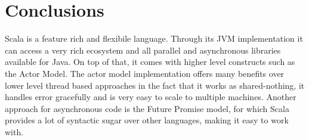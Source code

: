 \documentclass[12pt]{article}
\begin{document}
	\section{Conclusions}
	Scala is a feature rich and flexibile language. Through its JVM implementation it can 
	access a very rich ecosystem and all parallel and asynchronous libraries available for Java. 
	On top of that, it comes with higher level constructs such as the Actor Model. The actor 
	model implementation offers many benefits over lower level thread based approaches in the 
	fact that it works as shared-nothing, it handles error gracefully and is very easy to scale 
	to multiple machines. Another approach for asynchronous code is the Future Promise model, 
	for which Scala provides a lot of syntactic sugar over other languages, making it easy 
	to work with.

	\newpage
	
	
\end{document}
